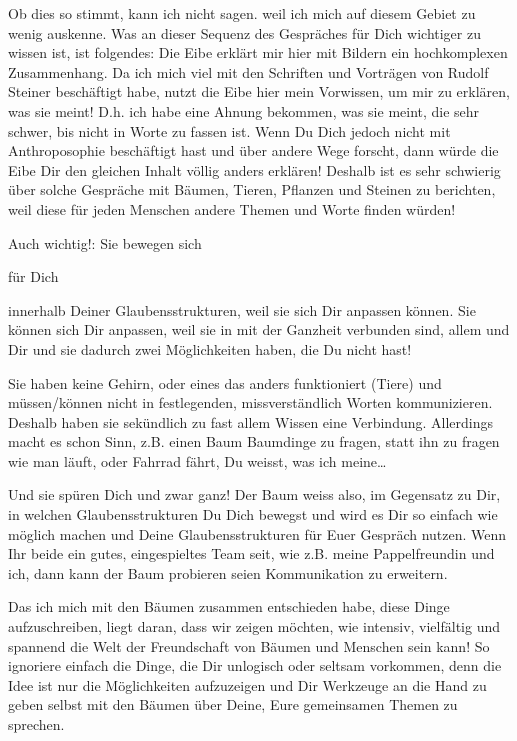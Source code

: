 \documentclass[11pt,titlepage,a5paper]{book}
\begin{document}
Ob dies so stimmt, kann ich nicht  sagen. weil ich mich auf diesem Gebiet zu wenig auskenne. Was an dieser Sequenz des Gespräches für Dich wichtiger zu wissen ist, ist folgendes: Die Eibe erklärt mir hier mit Bildern ein hochkomplexen Zusammenhang. Da ich mich viel mit den Schriften und Vorträgen von Rudolf Steiner beschäftigt habe, nutzt die Eibe hier mein Vorwissen, um mir zu erklären, was sie meint! D.h. ich habe eine Ahnung bekommen, was sie meint, die sehr schwer, bis nicht in Worte zu fassen ist. Wenn Du Dich jedoch nicht mit Anthroposophie beschäftigt hast und über andere Wege forscht, dann würde die Eibe Dir den gleichen Inhalt völlig anders erklären! Deshalb ist es sehr schwierig über solche Gespräche mit Bäumen, Tieren, Pflanzen und Steinen zu berichten, weil diese für jeden Menschen andere Themen und Worte finden würden!

Auch wichtig!: Sie bewegen sich \begin{Large}
für Dich
\end{Large} innerhalb Deiner Glaubensstrukturen, weil sie sich Dir anpassen können. Sie können sich Dir anpassen, weil sie in mit der Ganzheit verbunden sind, allem und Dir und sie dadurch zwei Möglichkeiten haben, die Du nicht hast!

Sie haben keine Gehirn, oder eines das anders funktioniert (Tiere) und müssen/können nicht in festlegenden, missverständlich Worten kommunizieren. Deshalb haben sie sekündlich zu fast allem Wissen eine Verbindung. Allerdings macht es schon Sinn, z.B. einen Baum Baumdinge zu fragen, statt ihn zu fragen wie man läuft, oder Fahrrad fährt, Du weisst, was ich meine\dots

Und sie spüren Dich und zwar ganz! Der Baum weiss also, im Gegensatz zu Dir, in welchen Glaubensstrukturen Du Dich bewegst und wird es Dir so einfach wie möglich machen und Deine Glaubensstrukturen für Euer Gespräch nutzen. Wenn Ihr beide ein gutes, eingespieltes Team seit, wie z.B. meine Pappelfreundin und ich, dann kann der Baum probieren seien Kommunikation zu erweitern.

Das ich mich mit den Bäumen zusammen entschieden habe, diese Dinge aufzuschreiben, liegt daran, dass wir zeigen möchten, wie intensiv, vielfältig und spannend die Welt der Freundschaft von Bäumen und Menschen sein kann! So ignoriere einfach die Dinge, die Dir unlogisch oder seltsam vorkommen, denn die Idee ist nur die Möglichkeiten aufzuzeigen und Dir Werkzeuge an die Hand zu geben selbst mit den Bäumen über Deine, Eure gemeinsamen Themen zu sprechen.
\end{document}
